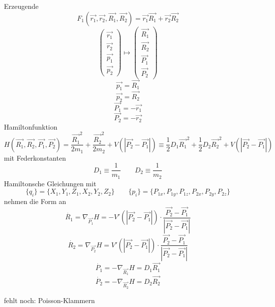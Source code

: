 \documentclass[11pt]{article} %
\begin{document}
Erzeugende \[ F_1(\vec{r_1}, \vec{r_2},\vec{R_1},\vec{R_2}) = \vec{r_1}\vec{R_1} + \vec{r_2}\vec{R_2} \]
\[
\begin{pmatrix}
\vec{r_1} \\ \vec{r_2} \\ \vec{p_1} \\ \vec{p_2}
\end{pmatrix}
\mapsto
\begin{pmatrix}
\vec{R_1} \\ \vec{R_2} \\ \vec{P_1} \\ \vec{P_2}
\end{pmatrix}
\]
\[ \vec{p_1} = \vec{R_1} \]
\[ \vec{p_2} = \vec{R_2} \]
\[ \vec{P_1} = -\vec{r_1} \]
\[ \vec{P_2} = -\vec{r_2} \]
Hamiltonfunktion
\[
H(\vec{R_1},\vec{R_2},\vec{P_1},\vec{P_2}) = 
\frac{\vec{R_1}^2}{2m_1} +  \frac{\vec{R_2}^2}{2m_2}
+ V(\left| \vec{P_2} - \vec{P_1} \right|) 
\equiv \frac{1}{2}D_1\vec{R_1}^2 + \frac{1}{2}D_2\vec{R_2}^2 + V(\left| \vec{P_2} - \vec{P_1} \right|)
\]
mit Federkonstanten
\[ D_1 \equiv \frac{1}{m_1} \quad \quad  D_2 \equiv \frac{1}{m_2} \]
Hamiltonsche Gleichungen
mit
\[ \{q_i\} = \{ X_1, Y_1, Z_1, X_2, Y_2, Z_2 \} \quad \quad \{p_i\} = \{ P_{1x}, P_{1y}, P_{1z}, P_{2x}, P_{2y}, P_{2z} \} \]
nehmen die Form an
\[ \dot{R_1} = \nabla_{\vec{P_1}} H = -V'( \left| \vec{P_2} - \vec{P_1} \right| ) \cdot \frac{ \vec{P_2} - \vec{P_1} }{\left| \vec{P_2} - \vec{P_1} \right|} \]
\[ \dot{R_2} = \nabla_{\vec{P_2}} H = V'( \left| \vec{P_2} - \vec{P_1} \right| ) \cdot \frac{ \vec{P_2} - \vec{P_1} }{\left| \vec{P_2} - \vec{P_1} \right|} \]
\[ \dot{P_1} = - \nabla_{\vec{R_1}} H = D_1 \vec{R_1} \]
\[ \dot{P_2} = - \nabla_{\vec{R_2}} H = D_2 \vec{R_2} \]

fehlt noch: Poisson-Klammern
\end{document}

